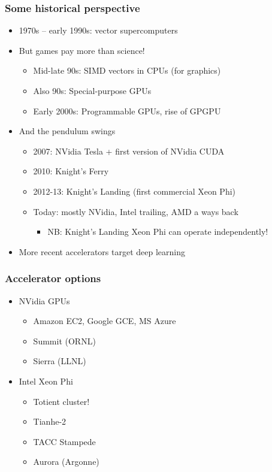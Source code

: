 \documentclass{beamer}
\begin{document}
\begin{frame}
  \frametitle{Some historical perspective}

  \begin{itemize}
  \item 1970s -- early 1990s: vector supercomputers
  \item But games pay more than science!
    \begin{itemize}
    \item Mid-late 90s: SIMD vectors in CPUs (for graphics)
    \item Also 90s: Special-purpose GPUs
    \item Early 2000s: Programmable GPUs, rise of GPGPU
    \end{itemize}
  \item And the pendulum swings
    \begin{itemize}
    \item 2007: NVidia Tesla + first version of NVidia CUDA
    \item 2010: Knight's Ferry
    \item 2012-13: Knight's Landing (first commercial Xeon Phi)
    \item Today: mostly NVidia, Intel trailing, AMD a ways back
      \begin{itemize}
      \item NB: Knight's Landing Xeon Phi can operate independently!
      \end{itemize}
    \end{itemize}
  \item More recent accelerators target deep learning
  \end{itemize}
\end{frame}


\begin{frame}
  \frametitle{Accelerator options}

  \begin{itemize}
  \item NVidia GPUs
    \begin{itemize}
    \item Amazon EC2, Google GCE, MS Azure
    \item Summit (ORNL)
    \item Sierra (LLNL)
    \end{itemize}
  \item Intel Xeon Phi
    \begin{itemize}
    \item Totient cluster!
    \item Tianhe-2
    \item TACC Stampede
    \item Aurora (Argonne)
    \end{itemize}
  \end{itemize}
\end{frame}
\end{document}
